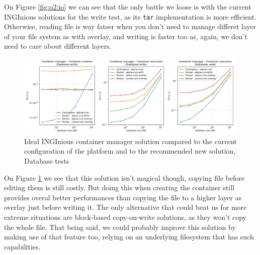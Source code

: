 On Figure \ref{fig:q2:io} we can see that the only battle we loose is with the current INGInious solutions for the write test, as its \texttt{tar} implementation is more efficient.  Otherwise, reading file is way fatser when you don't need to manage differet layer of your file system as with overlay, and writing is faster too as, again, we don't need to care about different layers.

\begin{figure}[h!]
  \begin{center}
    \includegraphics[width=\linewidth]{images/question-2-db.png}
    \caption{Ideal INGInious container manager solution compared to the current configuration of the platform and to the recommended new solution, Database tests}
    \label{fig:q2:db}
  \end{center}
\end{figure}

On Figure \ref{fig:q2:db} we see that this solution isn't magical though, copying file before editing them is still costly.  But doing this when creating the container still provides overal better performances than copying the file to a higher layer as overlay just before writing it.  The only alternative that could beat us for more extreme situations are block-based copy-on-write solutions, as they won't copy the whole file.  That being said, we could probably improve this solution by making use of that feature too, relying on an underlying filesystem that has such capabilities.

